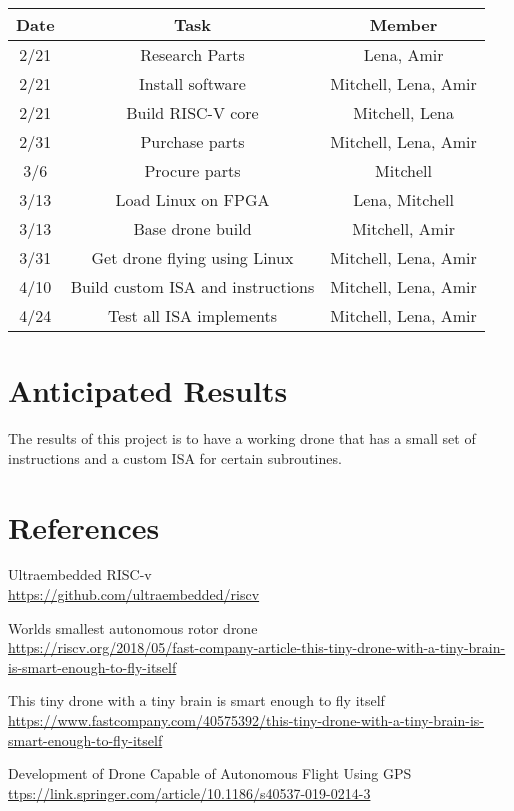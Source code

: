 \documentclass[12pt]{article}
\newcommand\tab[1][0.5cm]{\hspace*{#1}}
\begin{document}
\begin{center}
\begin{tabular}{ |c|c|c| } 
 \hline
 Date & Task & Member \\ 
 \hline
 2/21 & Research Parts & Lena, Amir \\
 2/21 & Install software & Mitchell, Lena, Amir \\
 2/21 & Build RISC-V core & Mitchell, Lena \\
 2/31 & Purchase parts & Mitchell, Lena, Amir \\ 
 3/6 & Procure parts & Mitchell \\ 
 3/13 & Load Linux on FPGA & Lena, Mitchell\\
 3/13 & Base drone build & Mitchell, Amir\\
 3/31 & Get drone flying using Linux & Mitchell, Lena, Amir\\
 4/10 & Build custom ISA and instructions & Mitchell, Lena, Amir \\
 4/24 & Test all ISA implements & Mitchell, Lena, Amir \\
 \hline
\end{tabular}
\end{center}


\section{Anticipated Results}
The results of this project is to have a working drone that has a small set of instructions and a custom ISA for certain subroutines. 

\clearpage
\section{References}

Ultraembedded RISC-v \\
\tab\href{https://github.com/ultraembedded/riscv}{https://github.com/ultraembedded/riscv}

Worlds smallest autonomous rotor drone\\
\tab\href{https://riscv.org/2018/05/fast-company-article-this-tiny-drone-with-a-tiny-brain-is-smart-enough-to-fly-itself/}{https://riscv.org/2018/05/fast-company-article-this-tiny-drone-with-a-tiny-brain-is-smart-enough-to-fly-itself}

This tiny drone with a tiny brain is smart enough to fly itself \\
\tab\href{https://www.fastcompany.com/40575392/this-tiny-drone-with-a-tiny-brain-is-smart-enough-to-fly-itself}{https://www.fastcompany.com/40575392/this-tiny-drone-with-a-tiny-brain-is-smart-enough-to-fly-itself}


Development of Drone Capable of Autonomous Flight Using GPS \\
\tab\href{ttps://link.springer.com/article/10.1186/s40537-019-0214-3}{ttps://link.springer.com/article/10.1186/s40537-019-0214-3}
\end{document}
